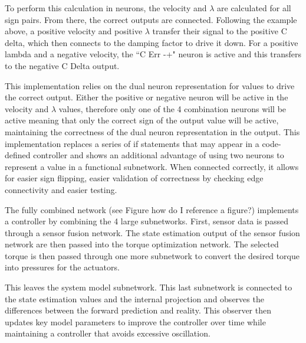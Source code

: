 To perform this calculation in neurons, the velocity and $\lambda$ are 
calculated for all sign pairs. From there, the correct outputs are connected.
Following the example above, a positive velocity and positive $\lambda$ transfer
their signal to the positive C delta, which then connects to the damping factor 
to drive it down. For a positive lambda and a negative velocity, the ``C Err -+" neuron is active and this transfers to the negative C Delta output.

This implementation relies on the dual neuron representation for values to drive
the correct output. Either the positive or negative neuron will be active in the
velocity and $\lambda$ values, therefore only one of the 4 combination neurons
will be active meaning that only the correct sign of the output value will be
active, maintaining the correctness of the dual neuron representation in the 
output. This implementation replaces a series of if statements that may appear
in a code-defined controller and shows an additional advantage of using two
neurons to represent a value in a functional subnetwork. When connected 
correctly, it allows for easier sign flipping, easier validation of correctness
by checking edge connectivity and easier testing.


The fully combined network (see Figure how do I reference a figure?) implements
a controller by combining the 4 large subnetworks. First, sensor data is passed
through a sensor fusion network. The state estimation output of the sensor 
fusion network are then passed into the torque optimization network. The 
selected torque is then passed through one more subnetwork to convert the
desired torque into pressures for the actuators.

This leaves the system model subnetwork. This last subnetwork is connected to 
the state estimation values and the internal projection and observes the 
differences between the forward prediction and reality. This observer then 
updates key model parameters to improve the controller over time while 
maintaining a controller that avoids excessive oscillation. 
